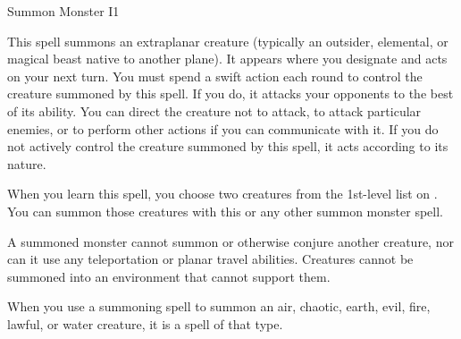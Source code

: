\begin{spellsection}{Summon Monster I}{1}\hypertarget{spell:summon monster}{}
    \begin{spellheader}
    \end{spellheader}
    \begin{spellcontent}
        \begin{spelltargetinginfo}
        \end{spelltargetinginfo}
        \begin{spelleffects}
            \spelleffect This spell summons an extraplanar creature (typically an outsider, elemental, or magical beast native to another plane). It appears where you designate and acts on your next turn. You must spend a swift action each round to control the creature summoned by this spell. If you do, it attacks your opponents to the best of its ability. You can direct the creature not to attack, to attack particular enemies, or to perform other actions if you can communicate with it. If you do not actively control the creature summoned by this spell, it acts according to its nature.
            \par When you learn this spell, you choose two creatures from the 1st-level list on . You can summon those creatures with this or any other summon monster spell.
            \par A summoned monster cannot summon or otherwise conjure another creature, nor can it use any teleportation or planar travel abilities. Creatures cannot be summoned into an environment that cannot support them.
            \par When you use a summoning spell to summon an air, chaotic, earth, evil, fire, lawful, or water creature, it is a spell of that type.
            \spelldur \durshort \dismissable
        \end{spelleffects}
    \end{spellcontent}
    \begin{spellfooter}
        \miscastexplode
    \end{spellfooter}
\end{spellsection}

